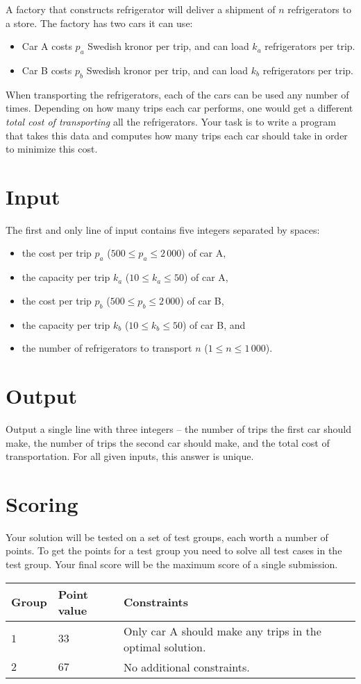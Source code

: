 A factory that constructs refrigerator will deliver a shipment of $n$ refrigerators to a store.
The factory has two cars it can use:
\begin{itemize}
    \item Car A costs $p_a$ Swedish kronor per trip, and can load $k_a$ refrigerators per trip.
    \item Car B costs $p_b$ Swedish kronor per trip, and can load $k_b$ refrigerators per trip.
\end{itemize}

When transporting the refrigerators, each of the cars can be used any number of times.
Depending on how many trips each car performs, one would get a different \emph{total cost of transporting} all the refrigerators.
Your task is to write a program that takes this data and computes how many trips each car should take in order to minimize this cost.

\section*{Input}
The first and only line of input contains five integers separated by spaces:

\begin{itemize}
    \item the cost per trip $p_a$ ($500 \le p_a \le 2\,000$) of car A,
    \item the capacity per trip $k_a$ ($10 \le k_a \le 50$) of car A,
    \item the cost per trip $p_b$ ($500 \le p_b \le 2\,000$) of car B,
    \item the capacity per trip $k_b$ ($10 \le k_b \le 50$) of car B, and
    \item the number of refrigerators to transport $n$ ($1 \le n \le 1\,000$).
\end{itemize}

\section*{Output}
Output a single line with three integers -- the number of trips the first car should make, the number of trips the second car should make, and the total cost of transportation.
For all given inputs, this answer is unique.

\section*{Scoring}
Your solution will be tested on a set of test groups, each worth a number of points.
To get the points for a test group you need to solve all test cases in the test group. Your final score will be the maximum score of a single submission.

\noindent
\begin{tabular}{| l | l | p{12cm} |}
  \hline
  \textbf{Group} & \textbf{Point value} & \textbf{Constraints} \\ \hline
  $1$    & $33$        & Only car A should make any trips in the optimal solution. \\ \hline
  $2$    & $67$        & No additional constraints. \\ \hline
\end{tabular}
